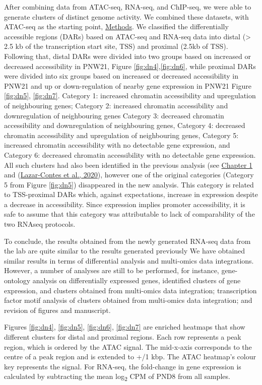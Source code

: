 \documentclass[12pt,twoside]{reedthesis}
\begin{document}
After combining data from ATAC-seq, RNA-seq, and ChIP-seq, we were able
to generate clusters of distinct genome activity. We combined these
datasets, with ATAC-seq as the starting point, \protect\hyperlink{methods}{Methods}. We classified
the differentially accessible regions (DARs) based on ATAC-seq and
RNA-seq data into distal (\textgreater{} 2.5 kb of the transcription start site,
TSS) and proximal (2.5kb of TSS). Following that, distal DARs were
divided into two groups based on increased or decreased accessibility in
PNW21, Figure \ref{fig:dn4},\ref{fig:dn6}, while proximal DARs were divided into six groups
based on increased or decreased accessibility in PNW21 and up or
down-regulation of nearby gene expression in PNW21 Figure \ref{fig:dn5}, \ref{fig:dn7}.
Category 1: increased chromatin accessibility and upregulation of
neighbouring genes; Category 2: increased chromatin accessibility and
downregulation of neighbouring genes Category 3: decreased chromatin
accessibility and downregulation of neighbouring genes, Category 4:
decreased chromatin accessibility and upregulation of neighbouring
genes, Category 5: increased chromatin accessibility with no detectable
gene expression, and Category 6: decreased chromatin accessibility with
no detectable gene expression. All such clusters had also been
identified in the previous analysis (see \protect\hyperlink{chapter1}{Chapter
1} and
(\protect\hyperlink{ref-lazarcontes_2020}{Lazar-Contes et al., 2020}), however one of the original categories (Category 5
from Figure \ref{fig:dn5}) disappeared in the new analysis. This category is related
to TSS-proximal DARs which, against expectations, increase in expression
despite a decrease in accessibility. Since expression implies promoter
accessibility, it is safe to assume that this category was attributable
to lack of comparability of the two RNAseq protocols.

To conclude, the results obtained from the newly generated RNA-seq data
from the lab are quite similar to the results generated previously We
have obtained similar results in terms of differential analysis and
multi-omics data integrations. However, a number of analyses are still
to be performed, for instance, gene-ontology analysis on differentially
expressed genes, identified clusters of gene expression, and clusters
obtained from multi-omics data integration; transcription factor motif
analysis of clusters obtained from multi-omics data integration; and
revision of figures and manuscript.

Figures \ref{fig:dn4}, \ref{fig:dn5}, \ref{fig:dn6}, \ref{fig:dn7} are enriched heatmaps that show different clusters for
distal and proximal regions. Each row represents a peak region, which is
ordered by the ATAC signal. The mid-x-axis corresponds to the centre of
a peak region and is extended to +/1 kbp. The ATAC heatmap's colour key
represents the signal. For RNA-seq, the fold-change in gene expression
is calculated by subtracting the mean log\textsubscript{2} CPM of PND8
from all samples.
\end{document}

